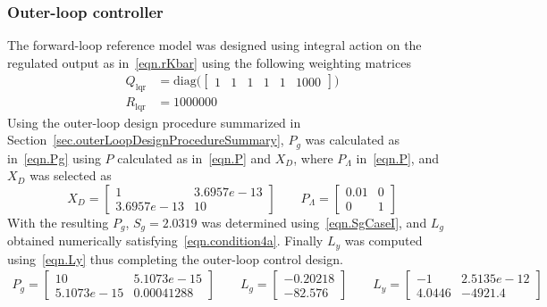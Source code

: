 \subsubsection{Outer-loop controller}

The forward-loop reference model was designed using integral action on the regulated output as in\ \eqref{eqn.rKbar} using the following weighting matrices
\begin{equation*}
  \begin{split}
    Q_{\text{lqr}}
    &=
    \text{diag}\bigr(
    \begin{bmatrix}
      1 & 1 & 1 & 1 & 1 & 1000
    \end{bmatrix}
    \bigr) \\
    R_{\text{lqr}}
    &=
    1000000
  \end{split}
\end{equation*}
Using the outer-loop design procedure summarized in Section~\ref{sec.outerLoopDesignProcedureSummary}, $P_{g}$ was calculated as in\ \eqref{eqn.Pg} using $P$ calculated as in\ \eqref{eqn.P} and $X_{D}$, where $P_{\Lambda}$ in\ \eqref{eqn.P}, and $X_{D}$ was selected as
\begin{equation*}
  X_{D}
  =
  \begin{bmatrix}
    1 & 3.6957e-13 \\
    3.6957e-13 & 10
  \end{bmatrix}
  \qquad
  P_{\Lambda}
  =
  \begin{bmatrix}
    0.01 & 0 \\
    0 & 1
  \end{bmatrix}
\end{equation*}
With the resulting $P_{g}$, $S_{g}=2.0319$ was determined using\ \eqref{eqn.SgCaseI}, and $L_{g}$ obtained numerically satisfying\ \eqref{eqn.condition4a}.
Finally $L_{y}$ was computed using\ \eqref{eqn.Ly} thus completing the outer-loop control design.
\begin{equation*}
  \begin{gathered}
    P_{g} =
    \begin{bmatrix}
      10 & 5.1073e-15 \\
      5.1073e-15 & 0.00041288
    \end{bmatrix}
    \qquad
    L_{g} =
    \begin{bmatrix}
      -0.20218 \\
      -82.576
    \end{bmatrix}
    \qquad
    L_{y} =
    \begin{bmatrix}
      -1 & 2.5135e-12 \\
      4.0446 & -4921.4
    \end{bmatrix}
  \end{gathered}
\end{equation*}

